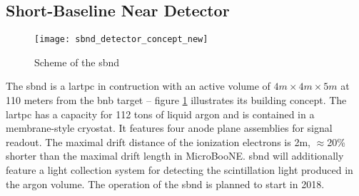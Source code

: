 \subsection{Short-Baseline Near Detector}

\begin{figure}
  \centering
  \texttt{[image: sbnd\_detector\_concept\_new]}
  \caption{Scheme of the \gls{sbnd}}
  \label{fig:sbnd_concept}
\end{figure}

The \gls{sbnd} is a \gls{lartpc} in contruction with an active volume of $4m \times 4m \times 5m$ at 110 meters from the \gls{bnb} target -- figure \ref{fig:sbnd_concept} illustrates its building concept.
The \gls{lartpc} has a capacity for 112 tons of liquid argon and is contained in a membrane-style cryostat.
It features four anode plane assemblies for signal readout.
The maximal drift distance of the ionization electrons is 2m, $\approx$20\% shorter than the maximal drift length in MicroBooNE.
\Gls{sbnd} will additionally feature a light collection system for detecting the scintillation light produced in the argon volume.
The operation of the \gls{sbnd} is planned to start in 2018.

